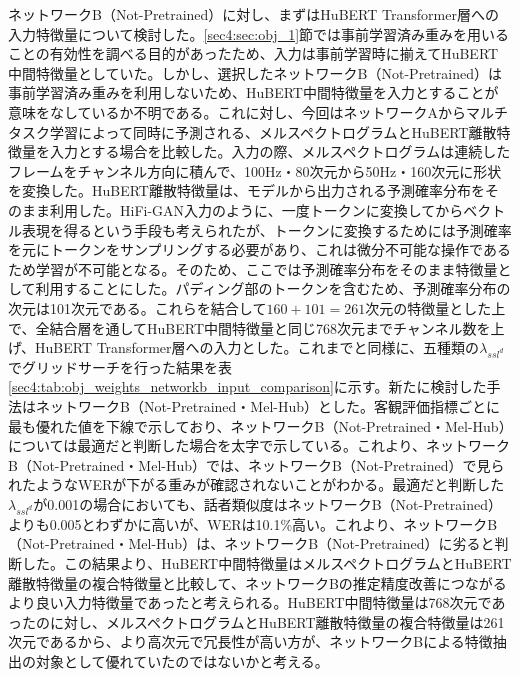 \documentclass[12pt]{jarticle}
\numberwithin{equation}{section}    %
\numberwithin{figure}{section}      %
\numberwithin{table}{section}      %
\begin{document}
ネットワークB（Not-Pretrained）に対し、まずはHuBERT Transformer層への入力特徴量について検討した。\ref{sec4:sec:obj_1}節では事前学習済み重みを用いることの有効性を調べる目的があったため、入力は事前学習時に揃えてHuBERT中間特徴量としていた。しかし、選択したネットワークB（Not-Pretrained）は事前学習済み重みを利用しないため、HuBERT中間特徴量を入力とすることが意味をなしているか不明である。これに対し、今回はネットワークAからマルチタスク学習によって同時に予測される、メルスペクトログラムとHuBERT離散特徴量を入力とする場合を比較した。入力の際、メルスペクトログラムは連続したフレームをチャンネル方向に積んで、100Hz・80次元から50Hz・160次元に形状を変換した。HuBERT離散特徴量は、モデルから出力される予測確率分布をそのまま利用した。HiFi-GAN入力のように、一度トークンに変換してからベクトル表現を得るという手段も考えられたが、トークンに変換するためには予測確率を元にトークンをサンプリングする必要があり、これは微分不可能な操作であるため学習が不可能となる。そのため、ここでは予測確率分布をそのまま特徴量として利用することにした。パディング部のトークンを含むため、予測確率分布の次元は101次元である。これらを結合して$160 + 101 = 261$次元の特徴量とした上で、全結合層を通してHuBERT中間特徴量と同じ768次元までチャンネル数を上げ、HuBERT Transformer層への入力とした。これまでと同様に、五種類の$\lambda_{ssl^{d}}$でグリッドサーチを行った結果を表\ref{sec4:tab:obj_weights_networkb_input_comparison}に示す。新たに検討した手法はネットワークB（Not-Pretrained・Mel-Hub）とした。客観評価指標ごとに最も優れた値を下線で示しており、ネットワークB（Not-Pretrained・Mel-Hub）については最適だと判断した場合を太字で示している。これより、ネットワークB（Not-Pretrained・Mel-Hub）では、ネットワークB（Not-Pretrained）で見られたようなWERが下がる重みが確認されないことがわかる。最適だと判断した$\lambda_{ssl^{d}}$が0.001の場合においても、話者類似度はネットワークB（Not-Pretrained）よりも0.005とわずかに高いが、WERは10.1\%高い。これより、ネットワークB（Not-Pretrained・Mel-Hub）は、ネットワークB（Not-Pretrained）に劣ると判断した。この結果より、HuBERT中間特徴量はメルスペクトログラムとHuBERT離散特徴量の複合特徴量と比較して、ネットワークBの推定精度改善につながるより良い入力特徴量であったと考えられる。HuBERT中間特徴量は768次元であったのに対し、メルスペクトログラムとHuBERT離散特徴量の複合特徴量は261次元であるから、より高次元で冗長性が高い方が、ネットワークBによる特徴抽出の対象として優れていたのではないかと考える。
\end{document}
